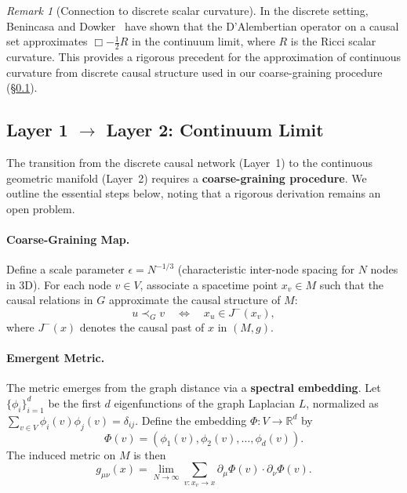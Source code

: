 \documentclass[11pt,a4paper]{article}
\theoremstyle{definition}
\theoremstyle{remark}
\newtheorem{remark}{Remark}[section]
\begin{document}
\begin{remark}[Connection to discrete scalar curvature]
In the discrete setting, Benincasa and Dowker~\cite{Benincasa2010} have
shown that the D'Alembertian operator on a causal set approximates
$\Box - \tfrac{1}{2}R$ in the continuum limit, where $R$ is the Ricci
scalar curvature.  This provides a rigorous precedent for the
approximation of continuous curvature from discrete causal structure
used in our coarse-graining procedure (\S\ref{subsec:continuum}).
\end{remark}

\subsection[Layer 1 to Layer 2: Continuum Limit]{Layer 1 $\to$ Layer 2: Continuum Limit}\label{subsec:continuum}

The transition from the discrete causal network (Layer~1) to the continuous
geometric manifold (Layer~2) requires a \textbf{coarse-graining procedure}. We
outline the essential steps below, noting that a rigorous derivation remains an
open problem.

\paragraph{Coarse-Graining Map.} Define a scale parameter
$\epsilon = N^{-1/3}$ (characteristic inter-node spacing for $N$ nodes in 3D).
For each node $v \in V$, associate a spacetime point $x_{v} \in M$ such that the
causal relations in $G$ approximate the causal structure of $M$:
\begin{equation}
u \prec_{G} v \quad \Longleftrightarrow \quad x_{u} \in J^{-}(x_{v}),
\end{equation}
where $J^{-}(x)$ denotes the causal past of $x$ in $(M, g)$.

\paragraph{Emergent Metric.} The metric emerges from the graph distance via a
\textbf{spectral embedding}. Let $\{\phi_{i}\}_{i=1}^{d}$ be the first $d$
eigenfunctions of the graph Laplacian $L$, normalized as
$\sum_{v \in V} \phi_{i}(v) \phi_{j}(v) = \delta_{ij}$. Define the embedding
$\Phi: V \to \mathbb{R}^{d}$ by
\begin{equation}
\Phi(v) = (\phi_{1}(v), \phi_{2}(v), \ldots, \phi_{d}(v)).
\end{equation}
The induced metric on $M$ is then
\begin{equation}
g_{\mu\nu}(x) = \lim_{N \to \infty}
\sum_{v: x_{v} \to x} \partial_{\mu} \Phi(v) \cdot \partial_{\nu} \Phi(v).
\end{equation}
\end{document}
